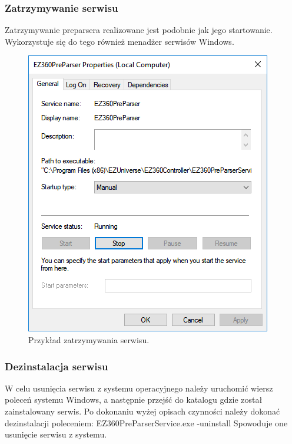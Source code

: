 \documentclass[a4paper]{book}
\begin{document}
\subsubsection{Zatrzymywanie serwisu}
Zatrzymywanie preparsera realizowane jest podobnie jak jego startowanie. Wykorzystuje się do tego również menadżer serwisów Windows.
\begin{figure}[h]
	\centering
	\includegraphics[width=\textwidth]{./img/zatrzymywanie_serwisu.png}
	\caption{Przykład zatrzymywania serwisu.}
	\label{fig:zatrzymywanie_serwisu}
\end{figure}
\subsubsection{Dezinstalacja serwisu}
W celu usunięcia serwisu z systemu operacyjnego należy uruchomić wiersz poleceń systemu Windows, a następnie przejść do katalogu gdzie został zainstalowany serwis. Po dokonaniu wyżej opisach czynności należy dokonać dezinstalacji poleceniem: \newline
EZ360PreParserService.exe -uninstall \newline
Spowoduje one usunięcie serwisu z systemu. 
\end{document}
